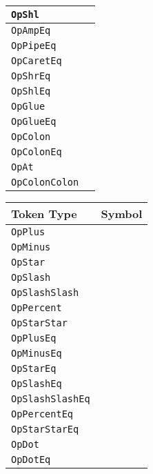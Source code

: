 \begin{table}[h]
{\begin{tabular}[t]{ll}
        \texttt{OpShl} & \op{<\textasciitilde} \\
        \hline
        \texttt{OpAmpEq} & \op{\&=} \\
        \texttt{OpPipeEq} & \op{|=} \\
        \texttt{OpCaretEq} & \op{\textasciicircum=} \\
        \texttt{OpShrEq} & \op{\textasciitilde>=} \\
        \texttt{OpShlEq} & \op{<\textasciitilde=} \\
        \hline
        \texttt{OpGlue} & \op{<>} \\
        \texttt{OpGlueEq} & \op{<>=} \\
        \texttt{OpColon} & \op{:} \\
        \texttt{OpColonEq} & \op{:=} \\
        \hline
        \texttt{OpAt} & \op{@} \\
        \texttt{OpColonColon} & \op{::} \\
        \hline
    \end{tabular}
}
\hfill
\parbox[t]{0.45\linewidth}{
    \centering
    \begin{tabular}[t]{ll}
        \hline
        \textbf{Token Type} & \textbf{Symbol} \\
        \hline
        \texttt{OpPlus} & \op{+} \\
        \texttt{OpMinus} & \op{-} \\
        \texttt{OpStar} & \op{*} \\
        \texttt{OpSlash} & \op{/} \\
        \texttt{OpSlashSlash} & \op{//} \\
        \texttt{OpPercent} & \op{\%} \\
        \texttt{OpStarStar} & \op{**} \\
        \hline
        \texttt{OpPlusEq} & \op{+=} \\
        \texttt{OpMinusEq} & \op{-=} \\
        \texttt{OpStarEq} & \op{*=} \\
        \texttt{OpSlashEq} & \op{/=} \\
        \texttt{OpSlashSlashEq} & \op{//=} \\
        \texttt{OpPercentEq} & \op{\%=} \\
        \texttt{OpStarStarEq} & \op{**=} \\
        \hline
        \texttt{OpDot} & \op{.} \\
        \texttt{OpDotEq} & \op{.=} \\

\end{tabular}}
\end{table}

